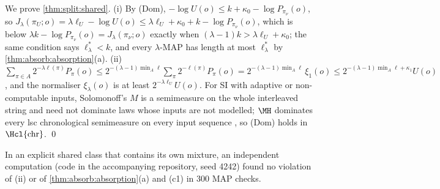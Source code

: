We prove \cref{thm:split:shared}. (i) By (Dom), $-\log U(o)\le k+\kappa_0-\log P_{\pi_\nu}(o)$, so $J_\lambda(\pi_U;o)=\lambda\ell_U-\log U(o)\le\lambda\ell_U+\kappa_0+k-\log P_{\pi_\nu}(o)$, which is below $\lambda k-\log P_{\pi_\nu}(o)=J_\lambda(\pi_\nu;o)$ exactly when $(\lambda-1)k>\lambda\ell_U+\kappa_0$; the same condition says $\ell^*_\lambda<k$, and every $\lambda$-MAP has length at most $\ell^*_\lambda$ by \cref{thm:absorb:absorption}(a). (ii) $\sum_{\pi\in A}2^{-\lambda\ell(\pi)}P_\pi(o)\le2^{-(\lambda-1)\min_A\ell}\sum_\pi2^{-\ell(\pi)}P_\pi(o)=2^{-(\lambda-1)\min_A\ell}\,\xi_1(o)\le2^{-(\lambda-1)\min_A\ell+\kappa_1}U(o)$, and the normaliser $\xi_\lambda(o)$ is at least $2^{-\lambda\ell_U}U(o)$. For SI with adaptive or non-computable inputs, Solomonoff's $M$ is a semimeasure on the whole interleaved string and need not dominate laws whose inputs are not modelled; $\MH$ dominates every lsc chronological semimeasure on every input sequence \citep{claudeSFI2026fundamentals}, so (Dom) holds in $\Hcl{\mathrm{chr}}$. \qed

In an explicit shared class that contains its own mixture, an independent computation (code in the accompanying repository, seed 4242) found no violation of (ii) or of \cref{thm:absorb:absorption}(a) and (c1) in 300 MAP checks.
